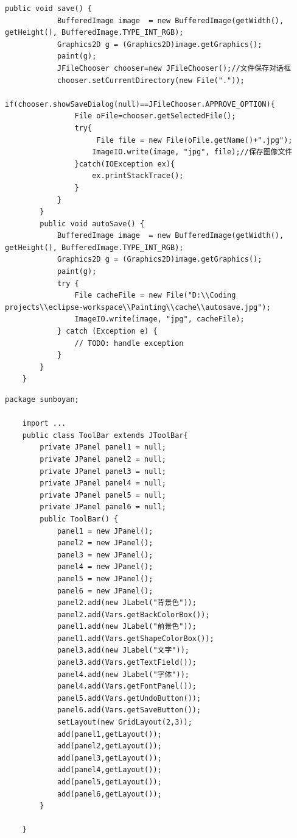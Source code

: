 \documentclass{ctexart}
\begin{document}
\begin{lstlisting}[caption = PaintPanel.java]
        public void save() {
            BufferedImage image  = new BufferedImage(getWidth(), getHeight(), BufferedImage.TYPE_INT_RGB);
            Graphics2D g = (Graphics2D)image.getGraphics();
            paint(g);
            JFileChooser chooser=new JFileChooser();//文件保存对话框
            chooser.setCurrentDirectory(new File("."));
            if(chooser.showSaveDialog(null)==JFileChooser.APPROVE_OPTION){
                File oFile=chooser.getSelectedFile();
                try{
                     File file = new File(oFile.getName()+".jpg");
                    ImageIO.write(image, "jpg", file);//保存图像文件
                }catch(IOException ex){
                    ex.printStackTrace();
                }
            }
        }
        public void autoSave() {
            BufferedImage image  = new BufferedImage(getWidth(), getHeight(), BufferedImage.TYPE_INT_RGB);
            Graphics2D g = (Graphics2D)image.getGraphics();
            paint(g);
            try {
                File cacheFile = new File("D:\\Coding projects\\eclipse-workspace\\Painting\\cache\\autosave.jpg");
                ImageIO.write(image, "jpg", cacheFile);
            } catch (Exception e) {
                // TODO: handle exception
            }
        }
    }      
\end{lstlisting}
\begin{lstlisting}[caption = ToolBar.java]
    package sunboyan;

    import ...
    public class ToolBar extends JToolBar{
        private JPanel panel1 = null;
        private JPanel panel2 = null;
        private JPanel panel3 = null;
        private JPanel panel4 = null;
        private JPanel panel5 = null;
        private JPanel panel6 = null;
        public ToolBar() {
            panel1 = new JPanel();
            panel2 = new JPanel();
            panel3 = new JPanel();
            panel4 = new JPanel();
            panel5 = new JPanel();
            panel6 = new JPanel();
            panel2.add(new JLabel("背景色"));
            panel2.add(Vars.getBackColorBox());
            panel1.add(new JLabel("前景色"));
            panel1.add(Vars.getShapeColorBox());
            panel3.add(new JLabel("文字"));
            panel3.add(Vars.getTextField());
            panel4.add(new JLabel("字体"));
            panel4.add(Vars.getFontPanel());
            panel5.add(Vars.getUndoButton());
            panel6.add(Vars.getSaveButton());
            setLayout(new GridLayout(2,3));
            add(panel1,getLayout());
            add(panel2,getLayout());
            add(panel3,getLayout());
            add(panel4,getLayout());
            add(panel5,getLayout());
            add(panel6,getLayout());
        }
        
    }     
\end{lstlisting}
\end{document}
